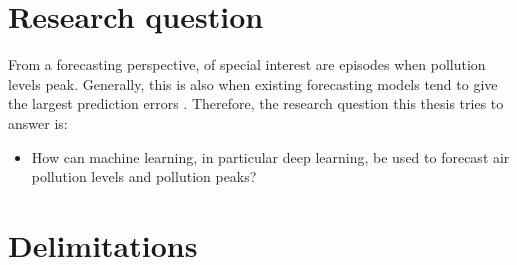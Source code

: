 \section{Research question}




From a forecasting perspective, of special interest are episodes when pollution levels peak. Generally, this is also when existing forecasting models tend to give the largest prediction errors \cite{atmos7020015}. Therefore, the research question this thesis tries to answer is: 

\begin{itemize}
\item How can machine learning, in particular deep learning, be used to forecast air pollution levels and pollution peaks?
\end{itemize}





\section{Delimitations}

